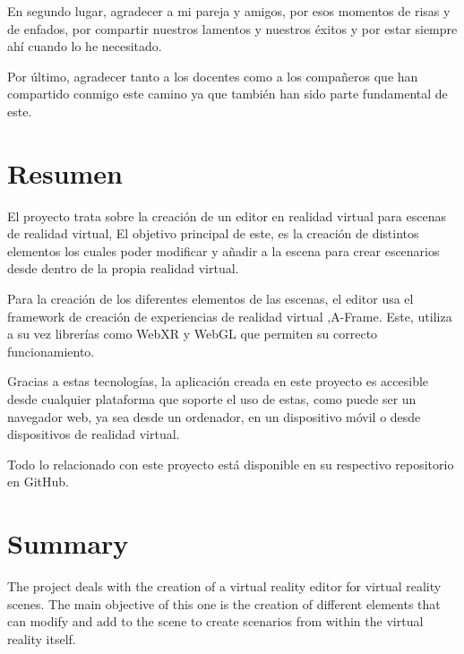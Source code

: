 \documentclass[a4paper, 12pt]{book}
\begin{document}
En segundo lugar, agradecer a mi pareja y amigos, por esos  momentos de risas y de enfados, por compartir nuestros lamentos y nuestros éxitos y por estar siempre ahí cuando lo he necesitado.

Por último, agradecer tanto a los docentes como a los compañeros que han compartido conmigo este camino ya que también han sido parte fundamental de este.


\chapter*{Resumen}

El proyecto trata sobre la creación de un editor en realidad virtual para escenas de realidad virtual, El objetivo principal de este, es la creación de distintos elementos los cuales poder modificar y añadir a la escena para crear escenarios desde dentro de la propia realidad virtual.

Para la creación de los diferentes elementos de las escenas, el editor usa el framework de creación de experiencias de realidad virtual ,A-Frame. Este, utiliza a su vez librerías como WebXR y WebGL que permiten su correcto funcionamiento.

Gracias a estas tecnologías, la aplicación creada en este proyecto es accesible desde cualquier plataforma que soporte el uso de estas, como puede ser un navegador web, ya sea desde un ordenador, en un dispositivo móvil o desde dispositivos de realidad virtual.

Todo lo relacionado con este proyecto está disponible en su respectivo repositorio en GitHub.



\chapter*{Summary}

The project deals with the creation of a virtual reality editor for virtual reality scenes. The main objective of this one is the creation of different elements that can modify and add to the scene to create scenarios from within the virtual reality itself.
\end{document}
